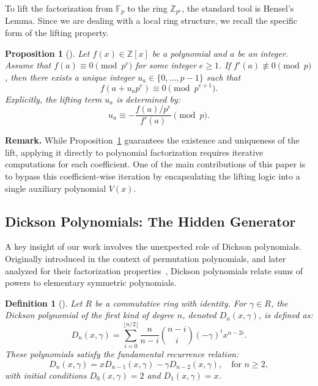\documentclass[12pt]{article}
\theoremstyle{plain}
\newtheorem{prop}{Proposition}
\newtheorem{defn}{Definition}
\numberwithin{equation}{section}
\begin{document}
To lift the factorization from $\mathbb{F}_p$ to the ring $\mathbb{Z}_{p^e}$, the standard tool is Hensel's Lemma. Since we are dealing with a local ring structure, we recall the specific form of the lifting property.

\begin{prop}[\cite{Lang1994}]\label{prop:hensel_lemma}
Let $f(x) \in \mathbb{Z}[x]$ be a polynomial and $a$ be an integer. Assume that $f(a) \equiv 0 \pmod{p^e}$ for some integer $e \geq 1$. If $f'(a) \not\equiv 0 \pmod p$, then there exists a unique integer $u_a \in \{0, \dots, p-1\}$ such that
$$f(a + u_a p^e) \equiv 0 \pmod{p^{e+1}}.$$
Explicitly, the lifting term $u_a$ is determined by:
\begin{equation}\label{eq:hensel_update}
u_a \equiv - \frac{f(a)/p^e}{f'(a)} \pmod p.
\end{equation}
\end{prop}

\noindent \textbf{Remark.} While Proposition~\ref{prop:hensel_lemma} guarantees the existence and uniqueness of the lift, applying it directly to polynomial factorization requires iterative computations for each coefficient. One of the main contributions of this paper is to bypass this coefficient-wise iteration by encapsulating the lifting logic into a single auxiliary polynomial $V(x)$.

\subsection{Dickson Polynomials: The Hidden Generator}

A key insight of our work involves the unexpected role of Dickson polynomials. Originally introduced in the context of permutation polynomials, and later analyzed for their factorization properties~\cite{Chou1997,Fitzgerald2005}, Dickson polynomials relate sums of powers to elementary symmetric polynomials.

\begin{defn}[\cite{Lidl1997}]\label{def:dickson}
Let $R$ be a commutative ring with identity. For $\gamma \in R$, the \textit{Dickson polynomial of the first kind} of degree $n$, denoted $D_n(x, \gamma)$, is defined as:
\begin{equation}\label{eq:dickson_formula}
D_n(x, \gamma) = \sum_{i=0}^{\lfloor n/2 \rfloor} \frac{n}{n-i} \binom{n-i}{i} (-\gamma)^i x^{n-2i}.
\end{equation}
These polynomials satisfy the fundamental recurrence relation:
$$D_n(x, \gamma) = x D_{n-1}(x, \gamma) - \gamma D_{n-2}(x, \gamma), \quad \text{for } n \geq 2,$$
with initial conditions $D_0(x, \gamma) = 2$ and $D_1(x, \gamma) = x$.
\end{defn}
\end{document}
